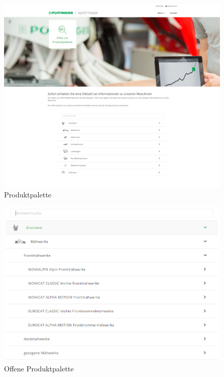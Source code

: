 \begin{figure}[H]
	\centerline{
		\includegraphics[width=1\textwidth, frame]{./grafiken/erm_produktpalette.png}
	}
	\vskip0pt
	\caption{Produktpalette} \label{fig:produktpalette}
\end{figure}

\begin{figure}[H]
	\centerline{
		\includegraphics[width=1\textwidth, frame]{./grafiken/erm_produktpalette_offen.png}
	}
	\vskip0pt
	\caption{Offene Produktpalette} \label{fig:produktpaletteOffen}
\end{figure}

